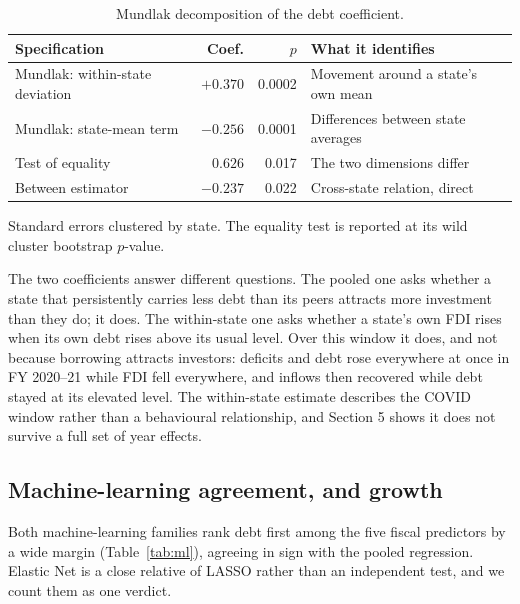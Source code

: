 \documentclass[12pt]{article}
\newcommand{\tnote}[1]{%
  \par\addvspace{4pt}%
  \begin{minipage}{0.92\textwidth}\footnotesize\raggedright #1\end{minipage}}
\begin{document}
\begin{table}[H]
\centering
\caption{Mundlak decomposition of the debt coefficient.}
\label{tab:mundlak}
\small
\begin{tabular}{@{}lrrl@{}}
\toprule
Specification & Coef. & $p$ & What it identifies \\
\midrule
Mundlak: within-state deviation & $+0.370$ & 0.0002 & Movement around a state's own mean \\
Mundlak: state-mean term        & $-0.256$ & 0.0001 & Differences between state averages \\
Test of equality                & $0.626$  & 0.017  & The two dimensions differ \\
Between estimator               & $-0.237$ & 0.022  & Cross-state relation, direct \\
\bottomrule
\end{tabular}
\tnote{Standard errors clustered by state. The equality test is reported at its
wild cluster bootstrap $p$-value.}
\end{table}

The two coefficients answer different questions. The pooled one asks whether a
state that persistently carries less debt than its peers attracts more investment
than they do; it does. The within-state one asks whether a state's own FDI rises
when its own debt rises above its usual level. Over this window it does, and not
because borrowing attracts investors: deficits and debt rose everywhere at once
in FY 2020--21 while FDI fell everywhere, and inflows then recovered while debt
stayed at its elevated level. The within-state estimate describes the COVID
window rather than a behavioural relationship, and Section 5 shows it does not
survive a full set of year effects.

\subsection{Machine-learning agreement, and growth}

Both machine-learning families rank debt first among the five fiscal predictors
by a wide margin (Table~\ref{tab:ml}), agreeing in sign with the pooled
regression. Elastic Net is a close relative of LASSO rather than an independent
test, and we count them as one verdict.
\end{document}
